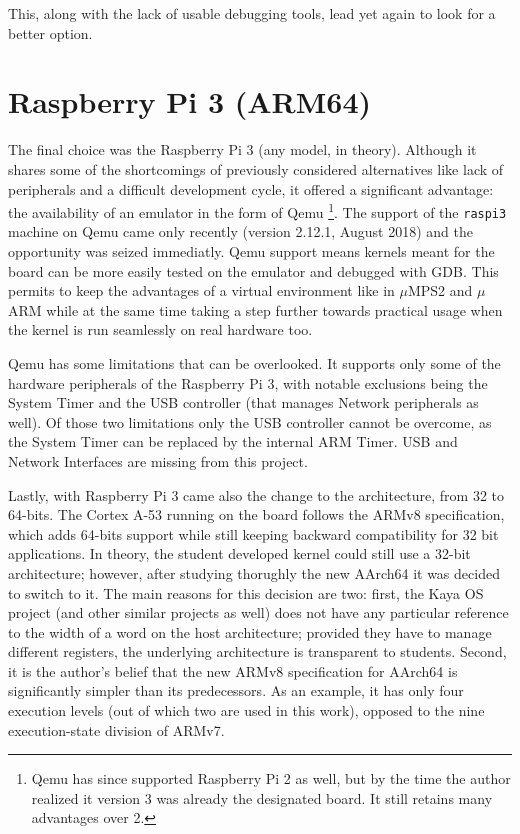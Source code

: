 \documentclass[12pt,a4paper,openright,twoside]{report}
\begin{document}
This, along with the lack of usable debugging tools, lead yet again to look for
a better option.

\newpage

\section{Raspberry Pi 3 (ARM64)}
\label{raspberry3}
The final choice was the Raspberry Pi 3 (any model, in theory). Although it shares
some of the shortcomings of previously considered alternatives like lack of 
peripherals and a difficult development cycle, it offered a significant advantage:
the availability of an emulator in the form of Qemu \footnote{Qemu has since 
supported Raspberry Pi 2
as well, but by the time the author realized it version 3 was already the designated
board. It still retains many advantages over 2.}.
The support of the {\tt raspi3} machine on Qemu came only recently (version 2.12.1, August 2018)
and the opportunity was seized immediatly. Qemu support means kernels meant for
the board can be more easily tested on the emulator and debugged with GDB.
This permits to keep the advantages of a virtual environment like in $\mu$MPS2 and
$\mu$ARM while at the same time taking a step further towards practical usage
when the kernel is run seamlessly on real hardware too.

Qemu has some limitations that can be overlooked. It supports only some of the
hardware peripherals of the Raspberry Pi 3, with notable exclusions being the
System Timer and the USB controller 
(that manages Network peripherals as well).
Of those two limitations only the USB controller cannot be overcome, as the 
System Timer can be replaced by the internal ARM Timer.
USB and Network Interfaces are missing from this project.

Lastly, with Raspberry Pi 3 came also the change to the architecture, from 32 
to 64-bits. The Cortex A-53 running on the board follows the ARMv8 specification,
which adds 64-bits support while still keeping backward compatibility for 32 bit
applications. In theory, the student developed kernel could still use a 32-bit
architecture; however, after studying thorughly the new AArch64 it was decided
to switch to it.
The main reasons for this decision are two: first, the Kaya OS project (and
other similar projects as well) does not have any particular reference to the
width of a word on the host architecture; provided they have to manage different
registers, the underlying architecture is transparent to students.
Second, it is the author's belief that the new ARMv8 specification for AArch64
is significantly simpler than its predecessors. As an example, it has only four execution
levels (out of which two are used in this work), opposed to the nine execution-state 
division of ARMv7.
\end{document}
